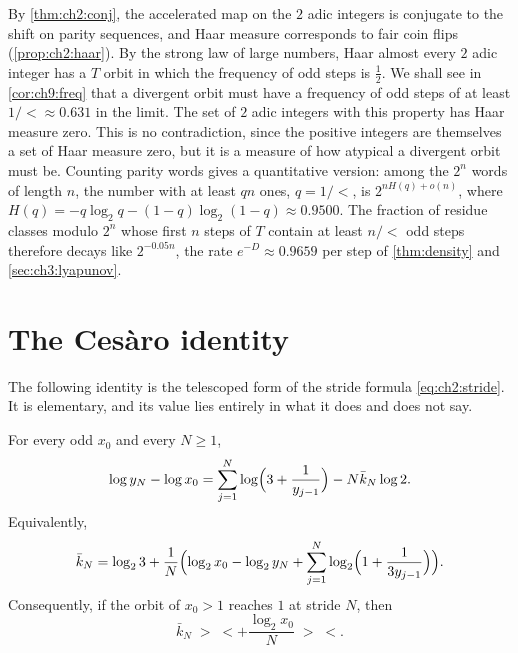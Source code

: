 \begin{remark}\label{rem:ch9:adic}
By \cref{thm:ch2:conj}, the accelerated map on the $2$ adic integers is
conjugate to the shift on parity sequences, and Haar measure corresponds to
fair coin flips (\cref{prop:ch2:haar}). By the strong law of large numbers,
Haar almost every $2$ adic integer has a $T$ orbit in which the frequency of
odd steps is $\tfrac12$. We shall see in \cref{cor:ch9:freq} that a divergent
orbit must have a frequency of odd steps of at least $1/\lt\approx0.631$ in the
limit. The set of $2$ adic integers with this property has Haar measure zero.
This is no contradiction, since the positive integers are themselves a set of
Haar measure zero, but it is a measure of how atypical a divergent orbit must
be. Counting parity words gives a quantitative version: among the $2^n$ words
of length $n$, the number with at least $qn$ ones, $q=1/\lt$, is
$2^{nH(q)+o(n)}$, where $H(q)=-q\log_2q-(1-q)\log_2(1-q)\approx0.9500$. The
fraction of residue classes modulo $2^n$ whose first $n$ steps of $T$ contain
at least $n/\lt$ odd steps therefore decays like $2^{-0.05n}$, the rate $e^{-D}\approx
0.9659$ per step of \cref{thm:density} and \cref{sec:ch3:lyapunov}.
\end{remark}

\section{The Ces\`aro identity}\label{sec:ch9:cesaro}

The following identity is the telescoped form of the stride formula
\eqref{eq:ch2:stride}. It is elementary, and its value lies entirely in what it
does and does not say.

\begin{proposition}\label{prop:cesaro}
For every odd $x_0$ and every $N\geq1$,
\begin{equation}\label{eq:ch9:cesaro}
  \log y_N-\log x_0=\sum_{j=1}^{N}\log\Bigl(3+\frac{1}{y_{j-1}}\Bigr)
  -N\bar k_N\log2 .
\end{equation}
Equivalently,
\begin{equation}\label{eq:ch9:kbar}
  \bar k_N=\log_2 3+\frac{1}{N}\Bigl(\log_2x_0-\log_2y_N+\sum_{j=1}^{N}
  \log_2\Bigl(1+\frac{1}{3y_{j-1}}\Bigr)\Bigr).
\end{equation}
Consequently, if the orbit of $x_0>1$ reaches $1$ at stride $N$, then
\begin{equation}\label{eq:ch9:forced}
  \bar k_N\;>\;\lt+\frac{\log_2x_0}{N}\;>\;\lt .
\end{equation}
\end{proposition}

